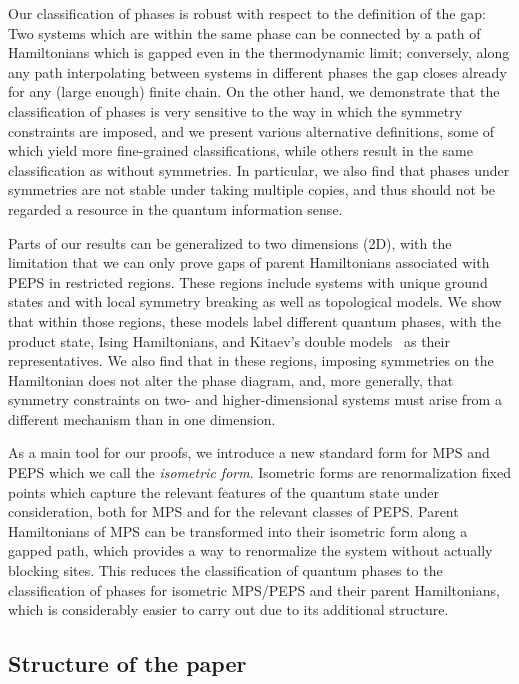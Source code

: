 \documentclass[twocolumn,superscriptaddress,prb,linenumbers]{revtex4-1}
\begin{document}
Our classification of phases is robust with respect to the definition of
the gap: Two systems which are within the same phase can
be connected by a path of Hamiltonians which is gapped even in the
thermodynamic limit; conversely, along any path interpolating between
systems in different phases the gap closes already for any (large enough)
finite chain.  On the other hand, we demonstrate that the classification
of phases is very sensitive to the way in which the symmetry constraints
are imposed, and we present various alternative definitions, some of which
yield more fine-grained classifications, while others result in the
same classification as without symmetries. In particular, we also find
that phases under symmetries are not stable under taking
multiple copies, and thus should not be regarded a resource in the quantum
information sense.


Parts of our results can be generalized to two dimensions (2D), with the
limitation that we can only prove gaps of parent Hamiltonians associated with
PEPS in restricted regions. These regions include systems with unique
ground states and with local symmetry breaking as well as topological
models. We show that within those regions, these models label different
quantum phases, with the product state, Ising Hamiltonians, and Kitaev's
double models~\cite{kitaev:toriccode} as their representatives. We also
find that in these regions, imposing symmetries on the Hamiltonian does
not alter the phase
diagram, and, more generally, that symmetry constraints on two- and
higher-dimensional systems must arise from a different mechanism than in
one dimension.



As a main tool for our proofs, we introduce a new standard form for MPS and
PEPS which we call the \emph{isometric form}. Isometric forms are
renormalization fixed points which capture the relevant features of the
quantum state under consideration, both for MPS and for the relevant
classes of PEPS. Parent Hamiltonians of MPS can be transformed into their
isometric form along a gapped path, which provides a way to renormalize
the system without actually blocking sites.  This reduces the
classification of quantum phases to the classification of phases for
isometric MPS/PEPS and their parent Hamiltonians, which is considerably
easier to carry out due to its additional structure.


\subsection{Structure of the paper}
\end{document}
